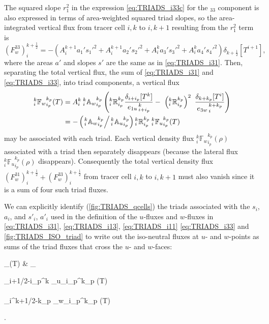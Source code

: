 \documentclass[../main/NEMO_manual]{subfiles}
\begin{document}
The squared slope $r_1^2$ in the expression \autoref{eq:TRIADS_i33c} for the $_{33}$ component is also expressed in
terms of area-weighted squared triad slopes,
so the area-integrated vertical flux from tracer cell $i,k$ to $i,k+1$ resulting from the $r_1^2$ term is
\begin{equation}
  \label{eq:TRIADS_i33}
  \left( F_w^{33} \right) _i^{k+\frac{1}{2}} =
  - \left( {A}_i^{k+1} a_{1}' s_{1}'^2
    + {A}_i^{k+1} a_{2}' s_{2}'^2
    + {A}_i^k a_{3}' s_{3}'^2
    + {A}_i^k a_{4}' s_{4}'^2 \right)\delta_{k+\frac{1}{2}} \left[ T^{i+1} \right],
\end{equation}
where the areas $a'$ and slopes $s'$ are the same as in \autoref{eq:TRIADS_i31}.
Then, separating the total vertical flux, the sum of \autoref{eq:TRIADS_i31} and \autoref{eq:TRIADS_i33},
into triad components, a vertical flux
\begin{align}
  \label{eq:TRIADS_vertflux-triad}
  _i^k {\mathbb{F}_w}_{i_p}^{k_p} (T)
  &= {A}_i^k{\: }_i^k{\mathbb{A}_w}_{i_p}^{k_p}
    \left(
    {_i^k\mathbb{R}_{i_p}^{k_p}}\frac{ \delta_{i+ i_p}[T^k] }{ {e_{1u}}_{\,i + i_p}^{\,k} }
    -\ \left({_i^k\mathbb{R}_{i_p}^{k_p}}\right)^2 \
    \frac{ \delta_{k+k_p} [T^i] }{{e_{3w}}_{\,i}^{\,k+k_p} }
    \right) \\
  &= - \left(\left.{ }_i^k{\mathbb{A}_w}_{i_p}^{k_p}\right/{ }_i^k{\mathbb{A}_u}_{i_p}^{k_p}\right)
    {_i^k\mathbb{R}_{i_p}^{k_p}}{\: }_i^k{\mathbb{F}_u}_{i_p}^{k_p} (T) \label{eq:TRIADS_vertflux-triad2}
\end{align}
may be associated with each triad.
Each vertical density flux $_i^k {\mathbb{F}_w}_{i_p}^{k_p} (\rho)$ associated with a triad then
separately disappears (because the lateral flux $_i^k{\mathbb{F}_u}_{i_p}^{k_p} (\rho)$ disappears).
Consequently the total vertical density flux
$\left( F_w^{31} \right)_i ^{k+\frac{1}{2}} + \left( F_w^{33} \right)_i^{k+\frac{1}{2}}$ from
tracer cell $i,k$ to $i,k+1$ must also vanish since it is a sum of four such triad fluxes.

We can explicitly identify (\autoref{fig:TRIADS_qcells}) the triads associated with the $s_i$, $a_i$,
and $s'_i$, $a'_i$ used in the definition of the $u$-fluxes and $w$-fluxes in \autoref{eq:TRIADS_i31},
\autoref{eq:TRIADS_i13}, \autoref{eq:TRIADS_i11} \autoref{eq:TRIADS_i33} and \autoref{fig:TRIADS_ISO_triad} to write out
the iso-neutral fluxes at $u$- and $w$-points as sums of the triad fluxes that cross the $u$- and $w$-faces:
\begin{flalign}
  \label{eq:TRIADS_iso_flux} _{}(T) &\equiv
  \sum_{}
  \begin{pmatrix}
    {_{i+1/2-i_p}^k {_u}_{i_p}^{k_p} } (T) \\ \\
    {_i^{k+1/2-k_p} {\mathbb{F}_w}_{i_p}^{k_p} } (T) \\
  \end{pmatrix}.
\end{flalign}
\end{document}
